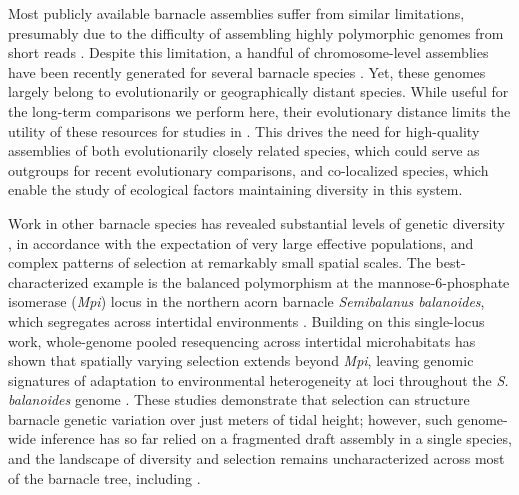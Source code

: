 Most publicly available barnacle assemblies suffer from similar limitations, presumably
due to the difficulty of assembling highly polymorphic genomes from short reads
\citep{vinson_assembly_2005,kajitani_efficient_2014}.
Despite this limitation, a handful of chromosome-level assemblies have been recently
generated for several barnacle species \citep{han_new_2024,bishop_genome_2025,
bernot_chromosome-level_2022,carlson_reference_2025,blaxter_genome_2023}.
Yet, these genomes largely belong to evolutionarily or geographically distant species.
While useful for the long-term comparisons we perform here, their evolutionary distance
limits the utility of these resources for studies in \bgla{}.
This drives the need for high-quality assemblies of both evolutionarily
closely related species, which could serve as outgroups for recent evolutionary
comparisons, and co-localized species, which enable the study of ecological factors
maintaining diversity in this system.
\vspace{0.1cm}

Work in other barnacle species has revealed substantial levels of genetic diversity
\citep{alm_rosenblad_genomic_2021}, in accordance with the expectation of very large
effective populations, and complex patterns of selection at remarkably small spatial
scales.
The best-characterized example is the balanced polymorphism at the mannose-6-phosphate
isomerase (\textit{Mpi}) locus in the northern acorn barnacle \textit{Semibalanus
balanoides}, which segregates across intertidal environments
\citep{schmidt_environmental_2000,nunez_footprints_2020}.
Building on this single-locus work, whole-genome pooled resequencing across intertidal
microhabitats has shown that spatially varying selection extends beyond \textit{Mpi},
leaving genomic signatures of adaptation to environmental heterogeneity at loci
throughout the \textit{S. balanoides} genome \citep{nunez_tides_2021}.
These studies demonstrate that selection can structure barnacle genetic variation over
just meters of tidal height; however, such genome-wide inference has so far relied on
a fragmented draft assembly in a single species, and the landscape of diversity and
selection remains uncharacterized across most of the barnacle tree, including \bgla{}.
\vspace{0.1cm}

